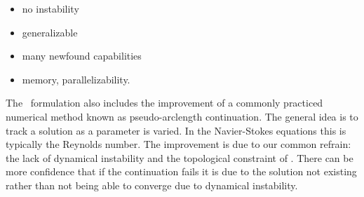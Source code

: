\begin{itemize}
{\begin{description}
\begin{itemize}
of an unstable manifold). An arbitrary norm is also chosen in the \spt\
context but there are some subtle differences. For starters, the
norm introduced in the \spt\ formulation is not beholden to dynamics, as
there are no longer any dynamics to speak of.
Additionally, the norm in the \spt\ case measures the distance between \twots,
not just single state space points. This is not a statement of proof but rather
a suggestion that the underlying topology improves the reliability of
the chosen norm. Restated in a different manner, the \spt\ norm
takes both the magnitude and phase into account.
Another numerical advantage is that the \spt\ formulation is able to find solutions
of the \KSe\ starting from modulated random noise. The specifics
of ``modulated random noise'' are described in the numerical methods section
but it can essentially be thought of as randomly assigning values to \spt\
Fourier modes. The ability to find solutions from this starting point
is a radical improvement over the conventional capabilities. This is of course
in conjunction with allowing the \spt\ domain to change. The reaction to these
changes individually has induced skepticism and disbelief; together they comprise
a completely unheard of force.
    \item no instability
    \item generalizable
    \item many newfound capabilities
    \item memory, parallelizability.
    \end{itemize}
\end{description}


The \spt\ formulation also includes the improvement of a commonly
practiced numerical method known as pseudo-arclength continuation.
The general idea is to track a solution as a parameter is varied. In the
Navier-Stokes equations this is typically the Reynolds number.
The improvement is due to our common refrain: the lack of dynamical
instability and the topological constraint of \twots. There can
be more confidence that if the continuation fails it is due to the solution
not existing rather than not being able to converge due to dynamical instability.
}


\end{itemize}
